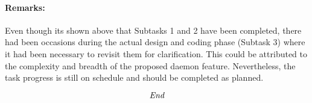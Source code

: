 \documentclass[10pt, a4]{article}
\begin{document}
\paragraph{Remarks:}
Even though its shown above that Subtasks 1 and 2 have been completed, there had been
occasions during the actual design and coding phase (Subtask 3) where it had been
necessary to revisit them for clarification. This could be attributed to the complexity and
breadth of the proposed daemon feature. Nevertheless, the task progress is still on schedule
and should be completed as planned.

\[\emph{End}\]
 
\end{document}

